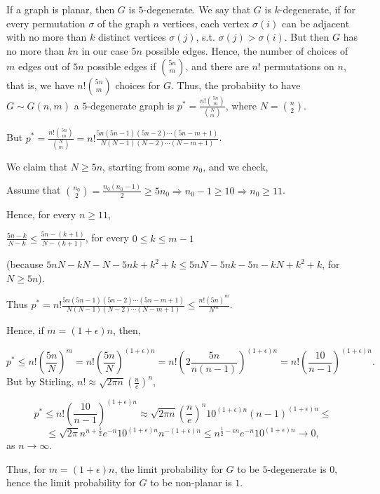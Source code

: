 \documentclass{article}
\begin{document}
\section{}
If a graph is planar, then $G$ is $5$-degenerate. We say that $G$ is $k$-degenerate, if for every permutation $\sigma$ of the graph $n$ vertices, each vertex $\sigma(i)$ can be adjacent with no more than $k$ distinct vertices $\sigma(j)$, s.t. $\sigma(j)>\sigma(i)$. But then $G$ has no more than $kn$ in our case $5n$ possible edges. Hence, the number of choices of $m$ edges out of $5n$ possible edges if $\binom{5n}{m}$, and there are $n!$ permutations on $n$, that is, we have $n!\binom{5n}{m}$ choices for $G$. Thus, the probabiity to have $G\sim{G(n,m)}$ a $5$-degenerate graph is $p^\ast=\frac{n!\binom{5n}{m}}{\binom{N}{m}}$, where $N=\binom{n}{2}$.

But $p^\ast=\frac{n!\binom{5n}{m}}{\binom{N}{m}}=n!\frac{5n(5n-1)(5n-2)\cdots(5n-m+1)}{N(N-1)(N-2)\cdots(N-m+1)}$.

We claim that $N\geq5n$, starting from some $n_0$, and we check,

Assume that $\binom{n_0}{2}=\frac{n_0(n_0-1)}{2}\geq5n_0\Rightarrow{n_0-1\geq10\Rightarrow{n_0\geq11}}$.

Hence, for every $n\geq11$,

$\frac{5n-k}{N-k}\leq\frac{5n-(k+1)}{N-(k+1)}$, for every $0\leq{k}\leq{m-1}$ 

(because $5nN-kN-N-5nk+k^2+k\leq5nN-5nk-5n-kN+k^2+k$, for $N\geq5n$).

Thus $p^\ast=n!\frac{5n(5n-1)(5n-2)\cdots(5n-m+1)}{N(N-1)(N-2)\cdots(N-m+1)}\leq\frac{n!(5n)^m}{N^m}$.

Hence, if $m=(1+\epsilon)n$, then,

\[
p^\ast\leq{n!(\frac{5n}{N})^m}=n!(\frac{5n}{N})^{(1+\epsilon)n}=n!(2\frac{5n}{n(n-1)})^{(1+\epsilon)n}=n!(\frac{10}{n-1})^{(1+\epsilon)n}.
\]
But by Stirling, $n!\approx\sqrt{2\pi{n}}(\frac{n}{e})^n$,

\[p^\ast\leq{n!(\frac{10}{n-1})^{(1+\epsilon)n}}\approx\sqrt{2\pi{n}}(\frac{n}{e})^n10^{(1+\epsilon)n}(n-1)^{(1+\epsilon)n}\leq\]\[\leq\sqrt{2\pi}n^{n+\frac{1}{2}}e^{-n}10^{(1+\epsilon)n}n^{-(1+\epsilon)n}\leq{n^{\frac{1}{2}-\epsilon{n}}e^{-n}10^{(1+\epsilon)n}}\rightarrow{0},
\]
as $n\rightarrow\infty$.

Thus, for $m=(1+\epsilon)n$, the limit probability for $G$ to be $5$-degenerate is {0}, hence the limit probability for $G$ to be non-planar is $1$.
\section{}
\end{document}
